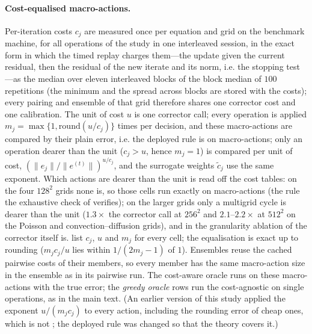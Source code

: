 \paragraph{Cost-equalised macro-actions.} Per-iteration costs $c_j$ are measured once per equation and grid on the benchmark machine, for all operations of the study in one interleaved session, in the exact form in which the timed replay charges them---the update given the current residual, then the residual of the new iterate and its norm, i.e. the stopping test---as the median over eleven interleaved blocks of the block median of $100$ repetitions (the minimum and the spread across blocks are stored with the costs); every pairing and ensemble of that grid therefore shares one corrector cost and one calibration. The unit of cost $u$ is one corrector call; every operation is applied $m_j = \max\{1,\mathrm{round}(u/c_j)\}$ times per decision, and these macro-actions are compared by their plain error, i.e. the deployed rule is  on macro-actions; only an operation dearer than the unit ($c_j > u$, hence $m_j = 1$) is compared per unit of cost, $(\|e_j\|/\|e^{(t)}\|)^{u/c_j}$, and the surrogate weights $\tilde c_j$ use the same exponent. Which actions are dearer than the unit is read off the cost tables: on the four $128^2$ grids none is, so those cells run exactly  on macro-actions (the rule the exhaustive check of  verifies); on the larger grids only a multigrid cycle is dearer than the unit ($1.3\times$ the corrector call at $256^2$ and $2.1$--$2.2\times$ at $512^2$ on the Poisson and convection--diffusion grids), and in the granularity ablation of  the corrector itself is.  list $c_j$, $u$ and $m_j$ for every cell; the equalisation is exact up to rounding ($m_j c_j/u$ lies within $1/(2m_j - 1)$ of $1$). Ensembles reuse the cached pairwise costs of their members, so every member has the same macro-action size in the ensemble as in its pairwise run. The cost-aware oracle runs  on these macro-actions with the true error; the \emph{greedy oracle} rows run the cost-agnostic  on single operations, as in the main text. (An earlier version of this study applied the exponent $u/(m_j c_j)$ to every action, including the rounding error of cheap ones, which is not ; the deployed rule was changed so that the theory covers it.)

